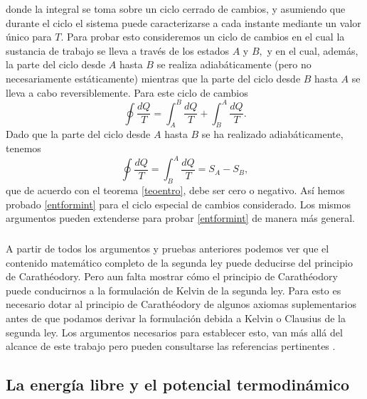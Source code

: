 \documentclass{article}
\theoremstyle{definition} \newtheorem{defi}{Definici\'on}
\theoremstyle{definition} \newtheorem{teo}{Teorema}
\theoremstyle{definition} \newtheorem{cor}{Corolario}
\begin{document}
donde la integral se toma sobre un ciclo cerrado de cambios, y asumiendo que durante el ciclo el sistema puede caracterizarse a cada instante mediante un valor \'unico para $T.$ Para probar esto consideremos un ciclo de cambios en el cual la sustancia de trabajo se lleva a trav\'es de los estados $A$ y $B,$ y en el cual, adem\'as, la parte del ciclo desde $A$ hasta $B$ se realiza adiab\'aticamente (pero no necesariamente est\'aticamente) mientras que la parte del ciclo desde $B$ hasta $A$ se lleva a cabo reversiblemente. Para este ciclo de cambios
\begin{equation}
\oint \frac{dQ}{T}=\int^B_A\frac{dQ}{T}+\int^A_B\frac{dQ}{T}.
\end{equation}
Dado que la parte del ciclo desde $A$ hasta $B$ se ha realizado adiab\'aticamente, tenemos
\begin{equation}
\oint \frac{dQ}{T}=\int^A_B\frac{dQ}{T}=S_A-S_B,
\end{equation}
que de acuerdo con el teorema \ref{teoentro}, debe ser cero o negativo. As\'i hemos probado \eqref{entformint} para el ciclo especial de cambios considerado. Los mismos argumentos pueden extenderse para probar \eqref{entformint} de manera m\'as general.
\subparagraph{}
A partir de todos los argumentos y pruebas anteriores podemos ver que el contenido matem\'atico completo de la segunda ley puede deducirse del principio de Carath\'eodory. Pero aun falta mostrar c\'omo el principio de Carath\'eodory puede conducirnos a la formulaci\'on de Kelvin de la segunda ley. Para esto es necesario dotar al principio de Carath\'eodory de algunos axiomas suplementarios antes de que podamos derivar la formulaci\'on debida a Kelvin o Clausius de la segunda ley. Los argumentos necesarios para establecer esto, van m\'as all\'a del alcance de este trabajo pero pueden consultarse las referencias pertinentes \cite{EA}.
\subsection{La energ\'ia libre y el potencial termodin\'amico}
\end{document}

